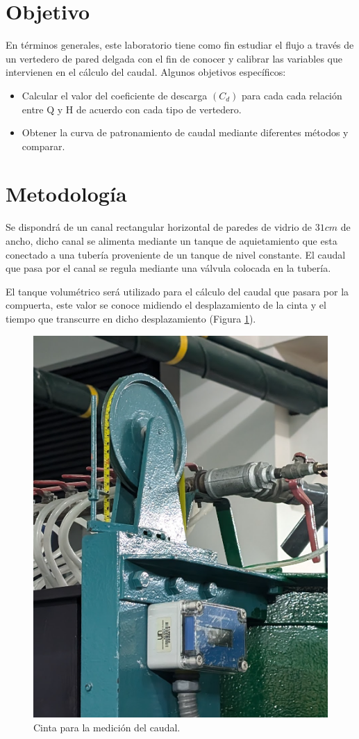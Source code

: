 \documentclass[10pt, a4paper]{exam}
\begin{document}
\section{Objetivo}

En términos generales, este laboratorio tiene como fin estudiar el flujo a través de un vertedero de pared delgada con el fin de conocer y calibrar las variables que intervienen en el cálculo del caudal. Algunos objetivos específicos:

\begin{itemize}

    \item Calcular el valor del coeficiente de descarga $(C_d)$ para cada cada relaci\'on entre Q y H de acuerdo con cada tipo de vertedero. 
    
    \item Obtener la curva de patronamiento de caudal mediante diferentes métodos y comparar.
    
\end{itemize}


\section{Metodología}

Se dispondrá de un canal rectangular horizontal de paredes de vidrio de $31cm$ de ancho, dicho canal se alimenta mediante un tanque de aquietamiento que esta conectado a una tubería proveniente de un tanque de nivel constante. El caudal que pasa por el canal se regula mediante una válvula colocada en la tubería. 

El tanque volumétrico será utilizado para el cálculo del caudal que pasara por la compuerta, este valor se conoce midiendo el desplazamiento de la cinta y el tiempo que transcurre en dicho desplazamiento (Figura \ref{fig:cinta}). 

\begin{figure}[h]
    \centering
    \includegraphics[width=0.29\linewidth]{Images/cinta.png}
    \caption{Cinta para la medición del caudal.}
    \label{fig:cinta}
\end{figure}
\end{document}
